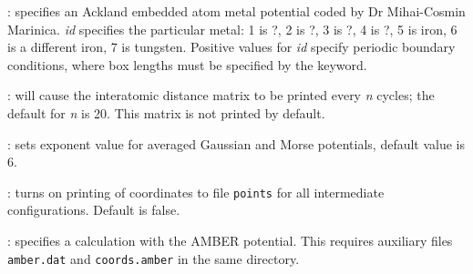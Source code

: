: specifies an Ackland embedded atom metal potential%
coded by Dr Mihai-Cosmin Marinica.
{\it id} specifies the particular metal: 1 is ?, 2 is ?, 3 is ?, 4 is ?, 5 is iron, 6 is a different iron,
7 is tungsten.
Positive values for {\it id} specify periodic boundary conditions, where box lengths must be
specified by the {\/} keyword. 

: will cause the
interatomic distance matrix to be printed every {\it n\/} cycles;
the default for {\it n\/} is 20. This matrix is not printed by default.

: sets exponent value for averaged Gaussian and Morse potentials,
default value is 6.

: turns on printing of coordinates to file {\tt points} for
all intermediate configurations. Default is false.

: specifies a calculation with the AMBER potential. This requires
      auxiliary files {\tt amber.dat} and {\tt coords.amber} in the same directory.

